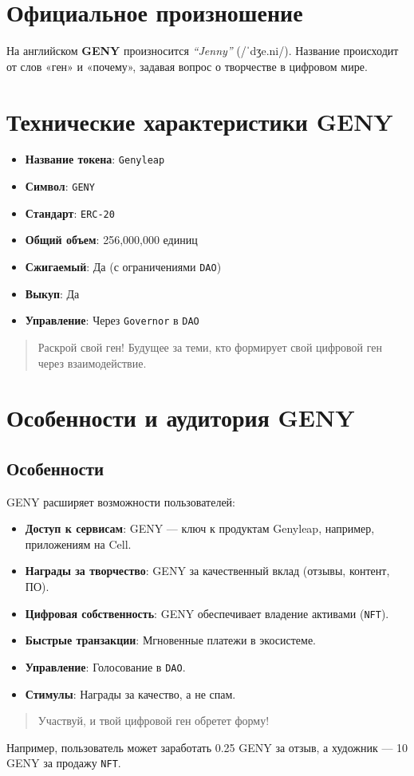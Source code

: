 \documentclass[a4paper,12pt,openany]{book}
\begin{document}
\section*{Официальное произношение}
На английском \textbf{GENY} произносится \textit{``Jenny''} ({\ipafont /ˈdʒe.ni/}). Название происходит от слов «ген» и «почему», задавая вопрос о творчестве в цифровом мире.

\section*{Технические характеристики GENY}
\begin{itemize}
    \item \textbf{Название токена}: \texttt{Genyleap}
    \item \textbf{Символ}: \texttt{GENY}
    \item \textbf{Стандарт}: \texttt{ERC-20}
    \item \textbf{Общий объем}: 256,000,000 единиц
    \item \textbf{Сжигаемый}: Да (с ограничениями \texttt{DAO})
    \item \textbf{Выкуп}: Да
    \item \textbf{Управление}: Через \texttt{Governor} в \texttt{DAO}
\end{itemize}
\vspace{-0.5em}
\begin{quote}
Раскрой свой ген! Будущее за теми, кто формирует свой цифровой ген через взаимодействие.
\end{quote}
\newpage

\section*{Особенности и аудитория GENY}
\subsection*{Особенности}
GENY расширяет возможности пользователей:
\begin{itemize}
    \item \textbf{Доступ к сервисам}: GENY — ключ к продуктам Genyleap, например, приложениям на Cell.
    \item \textbf{Награды за творчество}: GENY за качественный вклад (отзывы, контент, ПО).
    \item \textbf{Цифровая собственность}: GENY обеспечивает владение активами (\texttt{NFT}).
    \item \textbf{Быстрые транзакции}: Мгновенные платежи в экосистеме.
    \item \textbf{Управление}: Голосование в \texttt{DAO}.
    \item \textbf{Стимулы}: Награды за качество, а не спам.
\end{itemize}
\begin{quote}
Участвуй, и твой цифровой ген обретет форму!
\end{quote}
Например, пользователь может заработать 0.25 GENY за отзыв, а художник — 10 GENY за продажу \texttt{NFT}.
\end{document}
